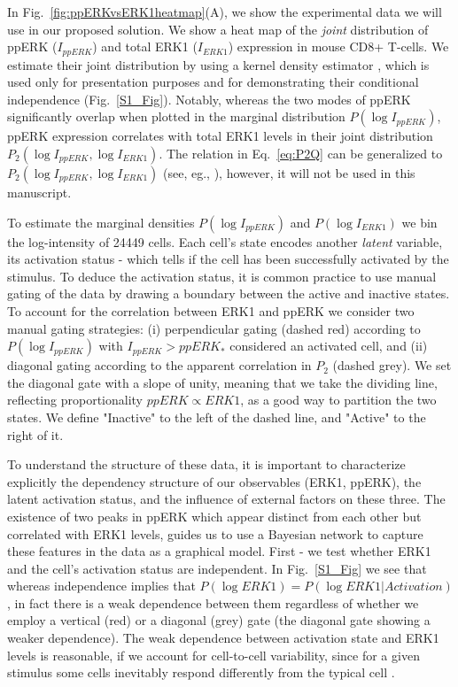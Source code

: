 \documentclass[11pt,a4paper,draft]{article}
\begin{document}
\smallskip
In Fig.~\ref{fig:ppERKvsERK1heatmap}(A), we show the experimental data we will use in our proposed solution. We show a heat map of the \emph{joint} distribution of ppERK ($I_{ppERK}$) and total ERK1 ($I_{ERK1}$) expression in mouse CD8+ T-cells. We estimate their joint distribution by using a kernel density estimator \cite{botev2010}, which is used only for presentation purposes and for demonstrating their conditional independence (Fig.~\ref{S1_Fig}).
Notably, whereas the two modes of ppERK significantly overlap when plotted in the marginal distribution $P(\log I_{ppERK})$, ppERK expression correlates with total ERK1 levels in their joint distribution $P_2(\log I_{ppERK},\log I_{ERK1})$. The relation in Eq.~\ref{eq:P2Q} can be generalized to $P_2(\log I_{ppERK},\log I_{ERK1})$ (see, eg., \cite{Mukhopadhyay2000}), however, it will not be used in this manuscript.

\smallskip
To estimate the marginal densities $P(\log I_{ppERK})$ and $P(\log I_{ERK1})$ we bin the log-intensity of 24449 cells.  Each cell's state encodes another \emph{latent} variable, its activation status - which tells if the cell has been successfully activated by the stimulus. To deduce the activation status, it is common practice to use manual gating of the data by drawing a boundary between the active and inactive states. To account for the correlation between ERK1 and ppERK we consider two manual gating strategies: (i) perpendicular gating (dashed red) according to $P(\log I_{ppERK})$ with $I_{ppERK}>ppERK_*$ considered an activated cell, and (ii) diagonal gating according to the apparent correlation in $P_2$ (dashed grey). We set the diagonal gate with a slope of unity, meaning that we take the dividing line, reflecting  proportionality $ppERK\propto ERK1$, as a good way to partition the two states. We define "Inactive" to the left of the dashed line, and "Active" to the right of it.
\smallskip

To understand the structure of these data, it is important to characterize explicitly the dependency structure of our observables (ERK1, ppERK), the latent activation status, and the influence of external factors on these three. The existence of two peaks in ppERK which appear distinct from each other but correlated with ERK1 levels, guides us to use a Bayesian network to capture these features in the data as a graphical model. First - we test whether ERK1 and the cell's activation status are independent. In Fig.~\ref{S1_Fig} we see that whereas independence implies that $P(\log ERK1) = P(\log ERK1 \vert Activation)$, in fact there is a weak dependence between them regardless of whether we employ a vertical (red) or a diagonal (grey) gate (the diagonal gate showing a weaker dependence). The weak dependence between activation state and ERK1 levels is reasonable, if we account for cell-to-cell variability, since for a given stimulus some cells inevitably respond differently from the typical cell \cite{Spencer2009}. 
\smallskip
\end{document}
